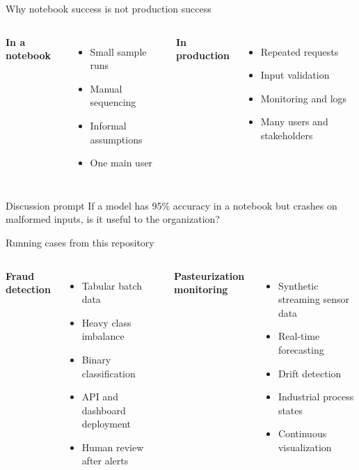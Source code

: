 \begin{frame}{Why notebook success is not production success}
\begin{columns}[T]
\textbf{In a notebook}
\begin{itemize}
\item Small sample runs
\item Manual sequencing
\item Informal assumptions
\item One main user
\end{itemize}
\textbf{In production}
\begin{itemize}
\item Repeated requests
\item Input validation
\item Monitoring and logs
\item Many users and stakeholders
\end{itemize}
\end{columns}
\vspace{0.6em}
\begin{block}{Discussion prompt}
If a model has 95\% accuracy in a notebook but crashes on malformed inputs, is it useful to the organization?
\end{block}
\coursefooter
\end{frame}

\begin{frame}{Running cases from this repository}
\begin{columns}[T]
\textbf{Fraud detection}
\begin{itemize}
\item Tabular batch data
\item Heavy class imbalance
\item Binary classification
\item API and dashboard deployment
\item Human review after alerts
\end{itemize}
\textbf{Pasteurization monitoring}
\begin{itemize}
\item Synthetic streaming sensor data
\item Real-time forecasting
\item Drift detection
\item Industrial process states
\item Continuous visualization
\end{itemize}
\end{columns}
\coursefooter
\end{frame}

